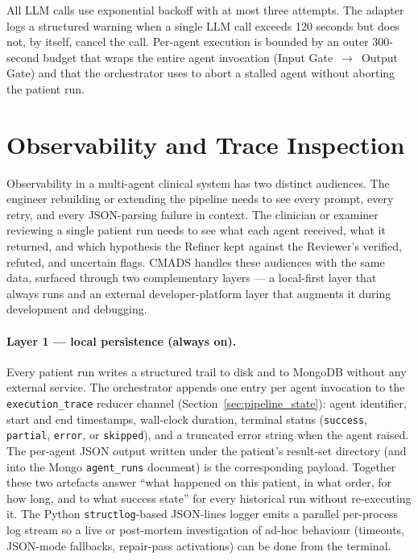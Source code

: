 All LLM calls use exponential backoff with at most three attempts. The
adapter logs a structured warning when a single LLM call exceeds 120
seconds but does not, by itself, cancel the call. Per-agent execution is
bounded by an outer 300-second budget that wraps the entire agent
invocation (Input Gate~$\to$~Output Gate) and that the orchestrator uses
to abort a stalled agent without aborting the patient run.

\FloatBarrier
\section{Observability and Trace Inspection}
\label{sec:observability}

Observability in a multi-agent clinical system has two distinct
audiences. The engineer rebuilding or extending the pipeline needs to
see every prompt, every retry, and every JSON-parsing failure in
context. The clinician or examiner reviewing a single patient run
needs to see what each agent received, what it returned, and which
hypothesis the Refiner kept against the Reviewer's verified, refuted,
and uncertain flags. CMADS handles these audiences with the same
data, surfaced through two complementary layers --- a local-first
layer that always runs and an external developer-platform layer that
augments it during development and debugging.

\paragraph{Layer 1 --- local persistence (always on).}
Every patient run writes a structured trail to disk and to MongoDB
without any external service. The orchestrator appends one entry per
agent invocation to the \texttt{execution\_trace} reducer channel
(Section~\ref{sec:pipeline_state}): agent identifier, start and end
timestamps, wall-clock duration, terminal status (\texttt{success},
\texttt{partial}, \texttt{error}, or \texttt{skipped}), and a
truncated error string when the agent raised. The per-agent JSON
output written under the patient's result-set directory (and into the
Mongo \texttt{agent\_runs} document) is the corresponding payload.
Together these two artefacts answer ``what happened on this patient,
in what order, for how long, and to what success state'' for every
historical run without re-executing it. The Python
\texttt{structlog}-based JSON-lines logger emits a parallel
per-process log stream so a live or post-mortem investigation of
ad-hoc behaviour (timeouts, JSON-mode fallbacks, repair-pass
activations) can be done from the terminal.

